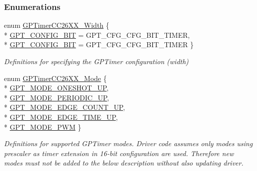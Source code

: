 \subsubsection*{Enumerations}
\begin{DoxyCompactItemize}
\item 
enum \hyperlink{_g_p_timer_c_c26_x_x_8h_a37f7594eb4084eff43d5b80bb6418ec7}{G\+P\+Timer\+C\+C26\+X\+X\+\_\+\+Width} \{ \\*
\hyperlink{_g_p_timer_c_c26_x_x_8h_a37f7594eb4084eff43d5b80bb6418ec7afbeda4c45001e3d32d50f576d6259016}{G\+P\+T\+\_\+\+C\+O\+N\+F\+I\+G\+\_\+B\+I\+T} = G\+P\+T\+\_\+\+C\+F\+G\+\_\+\+C\+F\+G\+\_\+B\+I\+T\+\_\+\+T\+I\+M\+E\+R, 
\\*
\hyperlink{_g_p_timer_c_c26_x_x_8h_a37f7594eb4084eff43d5b80bb6418ec7a2e5a3c43a8c62eeace6b38800d39392f}{G\+P\+T\+\_\+\+C\+O\+N\+F\+I\+G\+\_\+B\+I\+T} = G\+P\+T\+\_\+\+C\+F\+G\+\_\+\+C\+F\+G\+\_\+B\+I\+T\+\_\+\+T\+I\+M\+E\+R
 \}
\begin{DoxyCompactList}\small\item\em Definitions for specifying the G\+P\+Timer configuration (width) \end{DoxyCompactList}\item 
enum \hyperlink{_g_p_timer_c_c26_x_x_8h_ac3f0539fd948c59b31df04dff5b7024c}{G\+P\+Timer\+C\+C26\+X\+X\+\_\+\+Mode} \{ \\*
\hyperlink{_g_p_timer_c_c26_x_x_8h_ac3f0539fd948c59b31df04dff5b7024ca945157a7df9978aef69f2bc5d08328a5}{G\+P\+T\+\_\+\+M\+O\+D\+E\+\_\+\+O\+N\+E\+S\+H\+O\+T\+\_\+\+U\+P}, 
\\*
\hyperlink{_g_p_timer_c_c26_x_x_8h_ac3f0539fd948c59b31df04dff5b7024ca0c73c880888fc8da201a44bb87980578}{G\+P\+T\+\_\+\+M\+O\+D\+E\+\_\+\+P\+E\+R\+I\+O\+D\+I\+C\+\_\+\+U\+P}, 
\\*
\hyperlink{_g_p_timer_c_c26_x_x_8h_ac3f0539fd948c59b31df04dff5b7024ca8336182ae5bd6521222c07d159b22459}{G\+P\+T\+\_\+\+M\+O\+D\+E\+\_\+\+E\+D\+G\+E\+\_\+\+C\+O\+U\+N\+T\+\_\+\+U\+P}, 
\\*
\hyperlink{_g_p_timer_c_c26_x_x_8h_ac3f0539fd948c59b31df04dff5b7024ca3d1702ae14a42f1af112fb88b7fd7c77}{G\+P\+T\+\_\+\+M\+O\+D\+E\+\_\+\+E\+D\+G\+E\+\_\+\+T\+I\+M\+E\+\_\+\+U\+P}, 
\\*
\hyperlink{_g_p_timer_c_c26_x_x_8h_ac3f0539fd948c59b31df04dff5b7024ca5d09320529435b9b021abd37d4dac117}{G\+P\+T\+\_\+\+M\+O\+D\+E\+\_\+\+P\+W\+M}
 \}
\begin{DoxyCompactList}\small\item\em Definitions for supported G\+P\+Timer modes. Driver code assumes only modes using prescaler as timer extension in 16-\/bit configuration are used. Therefore new modes must not be added to the below description without also updating driver. \end{DoxyCompactList}\item 

\end{DoxyCompactItemize}
